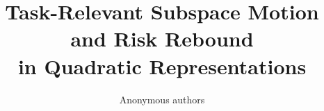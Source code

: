 \documentclass[10pt,twocolumn,letterpaper]{article}
\title{Task-Relevant Subspace Motion and Risk Rebound\\in Quadratic Representations}
\author{Anonymous authors}
\begin{document}
\maketitle

\label{main:content-end}
\clearpage
{\small


}
\clearpage

\end{document}
